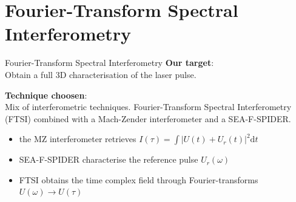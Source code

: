 \documentclass[11pt]{beamer}
\begin{document}
\section{Fourier-Transform Spectral Interferometry}
\begin{frame}{Fourier-Transform Spectral Interferometry}
\textbf{Our target}:\\
Obtain a full 3D characterisation of the laser pulse.

\vspace{15pt}
\textbf{Technique choosen}:\\
Mix of interferometric techniques.
Fourier-Transform Spectral Interferometry (FTSI) combined with a Mach-Zender interferometer and a SEA-F-SPIDER.\\
\begin{itemize}
	\item the MZ interferometer retrieves $I(\tau) 	= \int|U(t) + U_r(t)|^2\mathrm{d}t$
	\item SEA-F-SPIDER characterise the reference pulse $U_r(\omega)$
	\item FTSI obtains the time complex field through Fourier-transforms $U(\omega) \rightarrow U(\tau)$
\end{itemize}
%
\end{frame}

%
%
\end{document}
